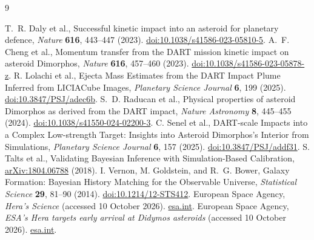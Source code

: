 \documentclass[10pt,twocolumn]{article}
\begin{document}
\begin{thebibliography}{9}
\raggedright
{}
T.~R. Daly et al., Successful kinetic impact into an asteroid
for planetary defence, \emph{Nature} \textbf{616},
443--447 (2023). \href{https://doi.org/10.1038/s41586-023-05810-5}{doi:10.1038/s41586-023-05810-5}.
A.~F. Cheng et al., Momentum transfer from the DART mission
kinetic impact on asteroid Dimorphos, \emph{Nature} \textbf{616},
457--460 (2023). \href{https://doi.org/10.1038/s41586-023-05878-z}{doi:10.1038/s41586-023-05878-z}.
R. Lolachi et al., Ejecta Mass Estimates from the DART Impact
Plume Inferred from LICIACube Images, \emph{Planetary Science
Journal} \textbf{6}, 199 (2025).
\href{https://doi.org/10.3847/PSJ/adec6b}{doi:10.3847/PSJ/adec6b}.
S.~D. Raducan et al., Physical properties of asteroid Dimorphos as
derived from the DART impact, \emph{Nature Astronomy} \textbf{8},
445--455 (2024).
\href{https://doi.org/10.1038/s41550-024-02200-3}{doi:10.1038/s41550-024-02200-3}.
C. Senel et al., DART-scale Impacts into a Complex Low-strength Target:
Insights into Asteroid Dimorphos's Interior from Simulations,
\emph{Planetary Science Journal} \textbf{6}, 157 (2025).
\href{https://doi.org/10.3847/PSJ/addf31}{doi:10.3847/PSJ/addf31}.
S. Talts et al., Validating Bayesian Inference with
Simulation-Based Calibration,
\href{https://arxiv.org/abs/1804.06788}{arXiv:1804.06788} (2018).
I. Vernon, M. Goldstein, and R.~G. Bower,
Galaxy Formation: Bayesian History Matching for the
Observable Universe, \emph{Statistical Science}
\textbf{29}, 81--90 (2014).
\href{https://doi.org/10.1214/12-STS412}{doi:10.1214/12-STS412}.
European Space Agency, \emph{Hera's Science} (accessed
10 October 2026). \href{https://www.esa.int/Space_Safety/Hera/Hera_s_Science}{esa.int}.
European Space Agency, \emph{ESA's Hera targets early arrival at
Didymos asteroids} (accessed 10 October 2026).
\href{https://www.esa.int/Space_Safety/Hera/ESA_s_Hera_targets_early_arrival_at_Didymos_asteroids}{esa.int}.
\end{thebibliography}
\end{document}
